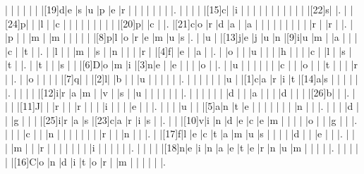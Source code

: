 \documentclass[12pt]{article}
\begin{document}
\begin{Puzzle}{22}{24}
  |{}  |{}  |{}  |{}  |{}  |{}  |[19]d|e   |s   |u   |p   |e   |r   |{}  |{}  |{}  |{}  |{}  |{}  |{}  |.
  |{}  |{}  |{}  |{}  |[15]c|{}  |i   |{}  |{}  |{}  |{}  |{}  |{}  |{}  |{}  |{}  |{}  |{}  |[22]s|{}  |.
  |{}  |[24]p|{}  |{}  |l   |{}  |c   |{}  |{}  |{}  |{}  |{}  |{}  |{}  |{}  |{}  |[20]p|{}  |c   |{}  |.
  |[21]c|o   |r   |d   |a   |{}  |a   |{}  |{}  |{}  |{}  |{}  |{}  |{}  |{}  |{}  |r   |{}  |r   |{}  |.
  |{}  |p   |{}  |{}  |m   |{}  |m   |{}  |{}  |{}  |{}  |{}  |[8]p|l   |o   |r   |e   |m   |u   |s   |.
  |{}  |u   |{}  |[13]j|e   |j   |u   |n   |[9]i|u   |m   |{}  |a   |{}  |{}  |{}  |c   |{}  |t   |{}  |.
  |{}  |l   |{}  |{}  |m   |{}  |s   |{}  |n   |{}  |{}  |{}  |r   |{}  |[4]f|{}  |e   |{}  |a   |{}  |.
  |{}  |o   |{}  |{}  |u   |{}  |{}  |{}  |h   |{}  |{}  |{}  |c   |{}  |l   |{}  |s   |{}  |t   |{}  |.
  |{}  |t   |{}  |{}  |s   |{}  |{}  |[6]D|o   |m   |i   |[3]n|e   |{}  |e   |{}  |{}  |{}  |o   |{}  |.
  |{}  |u   |{}  |{}  |{}  |{}  |{}  |{}  |c   |{}  |{}  |o   |{}  |{}  |t   |{}  |{}  |{}  |r   |{}  |.
  |{}  |o   |{}  |{}  |{}  |{}  |[7]q|{}  |{}  |[2]l|{}  |b   |{}  |{}  |u   |{}  |{}  |{}  |{}  |{}  |.
  |{}  |{}  |{}  |{}  |{}  |{}  |u   |{}  |[1]c|a   |r   |i   |t   |[14]a|s   |{}  |{}  |{}  |{}  |{}  |.
  |{}  |{}  |{}  |{}  |[12]i|r   |a   |m   |{}  |v   |{}  |s   |{}  |u   |{}  |{}  |{}  |{}  |{}  |{}  |.
  |{}  |{}  |{}  |{}  |{}  |{}  |d   |{}  |{}  |a   |{}  |{}  |{}  |d   |{}  |{}  |{}  |[26]b|{}  |{}  |.
  |{}  |{}  |{}  |[11]J|{}  |{}  |r   |{}  |{}  |r   |{}  |{}  |{}  |i   |{}  |{}  |{}  |e   |{}  |{}  |.
  |{}  |{}  |{}  |u   |{}  |{}  |[5]a|n   |t   |e   |{}  |{}  |{}  |{}  |{}  |{}  |{}  |n   |{}  |{}  |.
  |{}  |{}  |{}  |d   |{}  |{}  |g   |{}  |{}  |{}  |[25]i|r   |a   |s   |[23]c|a   |r   |i   |s   |{}  |.
  |{}  |{}  |[10]v|i   |n   |d   |e   |c   |e   |m   |{}  |{}  |{}  |{}  |o   |{}  |{}  |g   |{}  |{}  |.
  |{}  |{}  |{}  |c   |{}  |{}  |n   |{}  |{}  |{}  |{}  |{}  |{}  |{}  |r   |{}  |{}  |n   |{}  |{}  |.
  |{}  |[17]f|l   |e   |c   |t   |a   |m   |u   |s   |{}  |{}  |{}  |{}  |d   |{}  |{}  |e   |{}  |{}  |.
  |{}  |{}  |{}  |m   |{}  |{}  |r   |{}  |{}  |{}  |{}  |{}  |{}  |{}  |i   |{}  |{}  |{}  |{}  |{}  |.
  |{}  |{}  |{}  |{}  |[18]n|e   |i   |n   |a   |e   |t   |e   |r   |n   |u   |m   |{}  |{}  |{}  |{}  |.
  |{}  |{}  |{}  |{}  |{}  |[16]C|o   |n   |d   |i   |t   |o   |r   |{}  |m   |{}  |{}  |{}  |{}  |{}  |.
\end{Puzzle}
\end{document}
